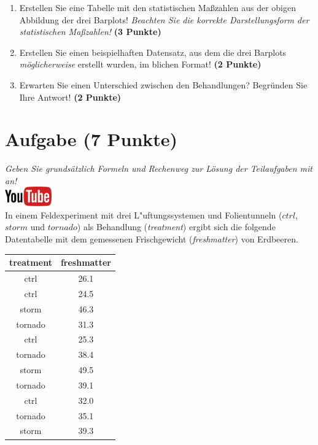 \documentclass[a4paper, 9pt]{scrartcl}\usepackage[]{graphicx}\usepackage[]{xcolor}
\begin{document}
\begin{enumerate}
\item Erstellen Sie eine Tabelle mit den statistischen Ma{\ss}zahlen aus der
  obigen Abbildung der drei Barplots! \textit{Beachten Sie die korrekte
    Darstellungsform der statistischen Ma{\ss}zahlen!} \textbf{(3 Punkte)}
\item Erstellen Sie einen beispielhaften Datensatz, aus dem die drei
  Barplots \textit{m{\"o}glicherweise} erstellt wurden, im blichen Format! \textbf{(2 Punkte)}
\item Erwarten Sie einen Unterschied zwischen den Behandlungen? Begr{\"u}nden
  Sie Ihre Antwort! \textbf{(2 Punkte)}
\end{enumerate} 
\clearpage

\section{Aufgabe \hfill (7 Punkte)}

\textit{Geben Sie grunds{\"a}tzlich Formeln und Rechenweg zur L{\"o}sung der
  Teilaufgaben mit an!} \\[1Ex]

\hfill\href{https://youtu.be/vXnLttRL_VI}{\includegraphics[width =
  2cm]{img/youtube}}\\[1Ex]



In einem Feldexperiment mit drei L{"u}ftungssystemen und Folientunneln ($ctrl$, $storm$ und $tornado$) als Behandlung
(\textit{treatment}) ergibt sich die folgende Datentabelle mit dem
gemessenen Frischgewicht (\textit{freshmatter}) von Erdbeeren.

\begin{table}[!h]
\centering
\begin{tabular}{cc}
\toprule
treatment & freshmatter\\
\midrule
ctrl & 26.1\\
ctrl & 24.5\\
storm & 46.3\\
tornado & 31.3\\
ctrl & 25.3\\
\addlinespace
tornado & 38.4\\
storm & 49.5\\
tornado & 39.1\\
ctrl & 32.0\\
tornado & 35.1\\
\addlinespace
storm & 39.3\\
\bottomrule
\end{tabular}
\end{table}
\end{document}

